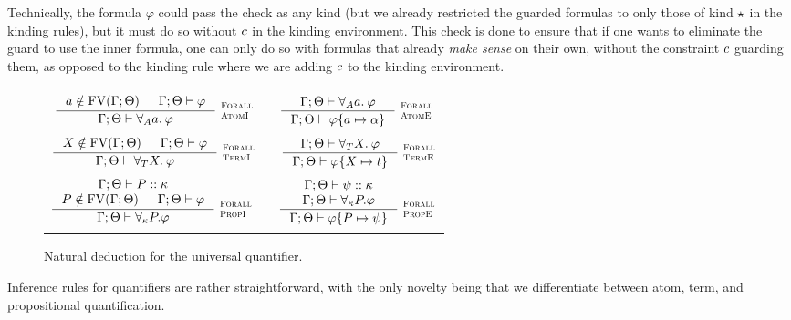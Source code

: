 \documentclass[english, mgr]{iithesis}
\renewcommand{\it}[1]{\textit{#1}}
\newcommand{\scbrk}[2]{\myatop{\textsc{#1}}{\textsc{#2}}}
\begin{document}
Technically, the formula $\varphi$ could pass the check as any kind
(but we already restricted the guarded formulas to only those of kind $\star$ in the kinding rules),
but it must do so without $c$ in the kinding environment.
This check is done to ensure that if one wants to eliminate the guard to use the inner formula,
one can only do so with formulas that already \it{make sense} on their own,
without the constraint $c$ guarding them, as opposed to the kinding rule
where we are adding $c$ to the kinding environment.

\begin{figure}[htbp]
  \centering
  \begin{tabularx}{\textwidth}{|C|}
  \hline \\ $
  \inference{
    \atomv \notin \fv[\cEnv;\Theta] &
    \jgmnt[\cEnv;\Theta]{\formphi}
  }{
    \jgmnt[\cEnv;\Theta]{\fForallAtom{\atomv}\formphi}
  }\:\scbrk{Forall}{AtomI}
  \qquad
  \inference{
    \jgmnt[\cEnv;\Theta]{\fForallAtom{\atomv}\formphi}
  }{
    \jgmnt[\cEnv;\Theta]{\formphi \{\atomv \mapsto \atomexp\}}
  }\:\scbrk{Forall}{AtomE}
  $ \\ \\ $
  \inference{
    \termv \notin \fv[\cEnv;\Theta] &
    \jgmnt[\cEnv;\Theta]{\formphi}
  }{
    \jgmnt[\cEnv;\Theta]{\fForallTerm{\termv}\formphi}
  }\:\scbrk{Forall}{TermI}
  \qquad
  \inference{
    \jgmnt[\cEnv;\Theta]{\fForallTerm{\termv}\formphi}
  }{
    \jgmnt[\cEnv;\Theta]{\formphi \{\termv \mapsto \term\}}
  }\:\scbrk{Forall}{TermE}
  $ \\ \\ $
  \inference{
    \jgmnt[\cEnv;\Theta]{\propv \ofkind \kind}
    \\
    \propv \notin \fv[\cEnv;\Theta] &
    \jgmnt[\cEnv;\Theta]{\formphi}
  }{
    \jgmnt[\cEnv;\Theta]{\fForallProp{\propv}{\kind}\formphi}
  }\:\scbrk{Forall}{PropI}
  \qquad
  \inference{
    \jgmnt[\cEnv;\Theta]{\psi \ofkind \kind}
    \\
    \jgmnt[\cEnv;\Theta]{\fForallProp{\propv}{\kind}\formphi}
  }{
    \jgmnt[\cEnv;\Theta]{\formphi \{\propv \mapsto \psi\}}
  }\:\scbrk{Forall}{PropE}
  $ \\ \\ \hline
  \end{tabularx}
  \caption{Natural deduction for the universal quantifier.}
  \label{fig:quantifiers}
\end{figure}
Inference rules for quantifiers are rather straightforward, with the only novelty
being that we differentiate between atom, term, and propositional quantification.
\end{document}
